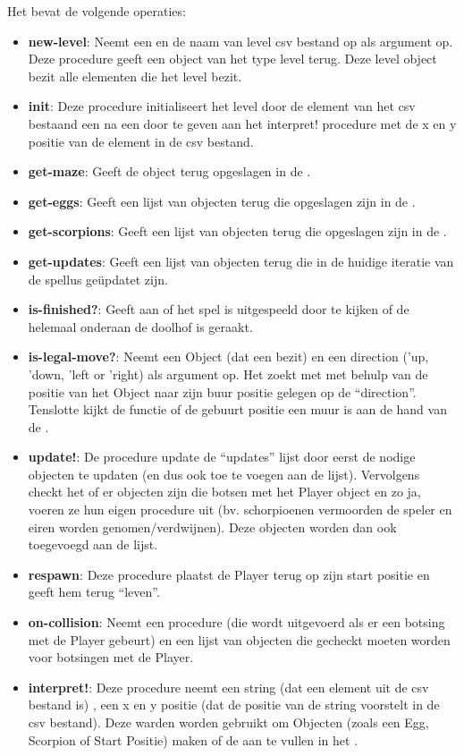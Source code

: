 Het \texttt{} bevat de volgende operaties:
\begin{itemize}
	\item \textbf{new-level}: Neemt een \texttt{} en de naam van level csv bestand op als argument op.
		Deze procedure geeft een object van het type level terug.
		Deze level object bezit alle elementen die het level bezit.
	\item \textbf{init}: Deze procedure initialiseert het level door de element van het csv bestaand een na een door te geven aan het interpret! procedure
		met de x en y positie van de element in de csv bestand.
	\item \textbf{get-maze}: Geeft de \texttt{} object terug opgeslagen in de \texttt{}.
	\item \textbf{get-eggs}: Geeft een lijst van \texttt{} objecten terug die opgeslagen zijn in de \texttt{}.
	\item \textbf{get-scorpions}: Geeft een lijst van \texttt{} objecten terug die opgeslagen zijn in de \texttt{}.
	\item \textbf{get-updates}: Geeft een lijst van objecten terug die in de huidige iteratie van de spellus geüpdatet zijn.
	\item \textbf{is-finished?}: Geeft aan of het spel is uitgespeeld door te kijken of de \texttt{} helemaal onderaan de doolhof is geraakt.
	\item \textbf{is-legal-move?}: Neemt een Object (dat een \texttt{} bezit) en een direction ('up, 'down, 'left or 'right) als argument op.
		Het zoekt met met behulp van de positie van het Object naar zijn buur positie gelegen op de ``direction''.
		Tenslotte kijkt de functie of de gebuurt positie een muur is aan de hand van de \texttt{}.
	\item \textbf{update!}: De procedure update de ``updates'' lijst
		door eerst de nodige objecten te updaten (en dus ook toe te voegen aan de lijst).
		Vervolgens checkt het of er objecten zijn die botsen met het Player object 
		en zo ja, voeren ze hun eigen procedure uit 
		(bv. schorpioenen vermoorden de speler en eiren worden genomen/verdwijnen).
		Deze objecten worden dan ook toegevoegd aan de lijst.
	\item \textbf{respawn}: Deze procedure plaatst de Player terug op zijn start positie en geeft hem terug ``leven''.
	\item \textbf{on-collision}: Neemt een procedure (die wordt uitgevoerd als er een botsing met de Player gebeurt) 
		en een lijst van objecten die gecheckt moeten worden voor botsingen met de Player.
	\item \textbf{interpret!}: Deze procedure neemt een string
		(dat een element uit de csv bestand is)
		, een x en y positie (dat de positie van de string voorstelt in de csv bestand).
		Deze warden worden gebruikt om Objecten (zoals een Egg, Scorpion of Start Positie) maken 
		of de \texttt{} aan te vullen in het \texttt{}.
\end{itemize}

